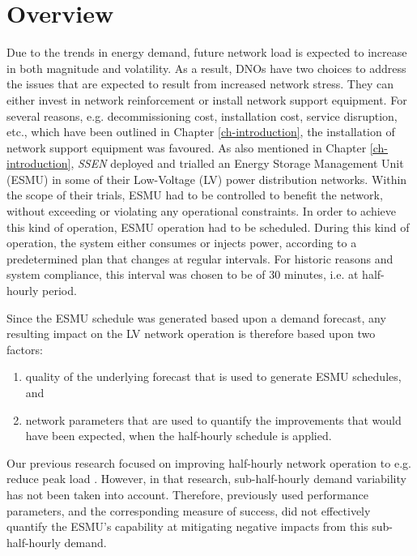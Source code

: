 \section{Overview}
\label{ch1:sec:overview}

Due to the trends in energy demand, future network load is expected to increase in both magnitude and volatility.
As a result, DNOs have two choices to address the issues that are expected to result from increased network stress.
They can either invest in network reinforcement or install network support equipment.
For several reasons, e.g. decommissioning cost, installation cost, service disruption, etc., which have been outlined in Chapter \ref{ch-introduction}, the installation of network support equipment was favoured.
As also mentioned in Chapter \ref{ch-introduction}, \textit{SSEN} deployed and trialled an Energy Storage Management Unit (ESMU) in some of their Low-Voltage (LV) power distribution networks.
Within the scope of their trials, ESMU had to be controlled to benefit the network, without exceeding or violating any operational constraints.
In order to achieve this kind of operation, ESMU operation had to be scheduled.
During this kind of operation, the system either consumes or injects power, according to a predetermined plan that changes at regular intervals.
For historic reasons and system compliance, this interval was chosen to be of 30 minutes, i.e. at half-hourly period.

Since the ESMU schedule was generated based upon a demand forecast, any resulting impact on the LV network operation is therefore based upon two factors:

\begin{enumerate}
	\item quality of the underlying forecast that is used to generate ESMU schedules, and
	\item network parameters that are used to quantify the improvements that would have been expected, when the half-hourly schedule is applied.
\end{enumerate}

Our previous research focused on improving half-hourly network operation to e.g. reduce peak load \cite{Rowe2014a, Yunusov2011}.
However, in that research, sub-half-hourly demand variability has not been taken into account.
Therefore, previously used performance parameters, and the corresponding measure of success, did not effectively quantify the ESMU's capability at mitigating negative impacts from this sub-half-hourly demand.

